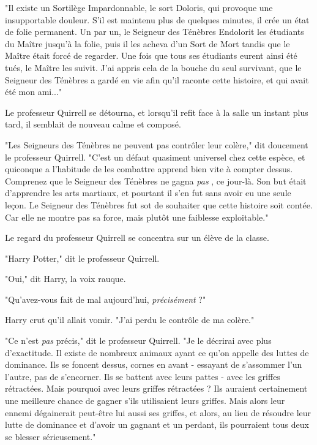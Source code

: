 "Il existe un Sortilège Impardonnable, le sort Doloris, qui provoque une insupportable douleur. S'il est maintenu plus de quelques minutes, il crée un état de folie permanent. Un par un, le Seigneur des Ténèbres Endolorit les étudiants du Maître jusqu'à la folie, puis il les acheva d'un Sort de Mort tandis que le Maître était forcé de regarder. Une fois que tous ses étudiants eurent ainsi été tués, le Maître les suivit. J'ai appris cela de la bouche du seul survivant, que le Seigneur des Ténèbres a gardé en vie afin qu'il raconte cette histoire, et qui avait été mon ami..."

Le professeur Quirrell se détourna, et lorsqu'il refit face à la salle un instant plus tard, il semblait de nouveau calme et composé.

"Les Seigneurs des Ténèbres ne peuvent pas contrôler leur colère," dit doucement le professeur Quirrell. "C'est un défaut quasiment universel chez cette espèce, et quiconque a l'habitude de les combattre apprend bien vite à compter dessus. Comprenez que le Seigneur des Ténèbres ne gagna \emph{pas} , ce jour-là. Son but était d'apprendre les arts martiaux, et pourtant il s'en fut sans avoir eu une seule leçon. Le Seigneur des Ténèbres fut sot de souhaiter que cette histoire soit contée. Car elle ne montre pas sa force, mais plutôt une faiblesse exploitable."

Le regard du professeur Quirrell se concentra sur un élève de la classe.

"Harry Potter," dit le professeur Quirrell.

"Oui," dit Harry, la voix rauque.

"Qu'avez-vous fait de mal aujourd'hui, \emph{précisément}  ?"

Harry crut qu'il allait vomir. "J'ai perdu le contrôle de ma colère."

"Ce n'est \emph{pas}  précis," dit le professeur Quirrell. "Je le décrirai avec plus d'exactitude. Il existe de nombreux animaux ayant ce qu'on appelle des luttes de dominance. Ils se foncent dessus, cornes en avant - essayant de s'assommer l'un l'autre, pas de s'encorner. Ils se battent avec leurs pattes - avec les griffes rétractées. Mais pourquoi avec leurs griffes rétractées ? Ils auraient certainement une meilleure chance de gagner s'ils utilisaient leurs griffes. Mais alors leur ennemi dégainerait peut-être lui aussi ses griffes, et alors, au lieu de résoudre leur lutte de dominance et d'avoir un gagnant et un perdant, ils pourraient tous deux se blesser sérieusement."

